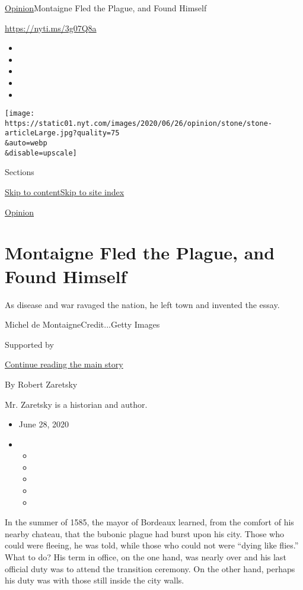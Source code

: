 \href{/section/opinion}{Opinion}\textbar{}Montaigne Fled the Plague, and
Found Himself

\href{https://nyti.ms/3g07Q8a}{https://nyti.ms/3g07Q8a}

\begin{itemize}
\item
\item
\item
\item
\item
\end{itemize}

\texttt{[image: https://static01.nyt.com/images/2020/06/26/opinion/stone/stone-articleLarge.jpg?quality=75\\\&auto=webp\\\&disable=upscale]}

Sections

\protect\hyperlink{site-content}{Skip to
content}\protect\hyperlink{site-index}{Skip to site index}

\href{/section/opinion}{Opinion}

\hypertarget{montaigne-fled-the-plague-and-found-himself}{%
\section{Montaigne Fled the Plague, and Found
Himself}\label{montaigne-fled-the-plague-and-found-himself}}

As disease and war ravaged the nation, he left town and invented the
essay.

Michel de MontaigneCredit...Getty Images

Supported by

\protect\hyperlink{after-sponsor}{Continue reading the main story}

By Robert Zaretsky

Mr. Zaretsky is a historian and author.

\begin{itemize}
\item
  June 28, 2020
\item
  \begin{itemize}
  \item
  \item
  \item
  \item
  \item
  \end{itemize}
\end{itemize}

In the summer of 1585, the mayor of Bordeaux learned, from the comfort
of his nearby chateau, that the bubonic plague had burst upon his city.
Those who could were fleeing, he was told, while those who could not
were ``dying like flies.'' What to do? His term in office, on the one
hand, was nearly over and his last official duty was to attend the
transition ceremony. On the other hand, perhaps his duty was with those
still inside the city walls.

